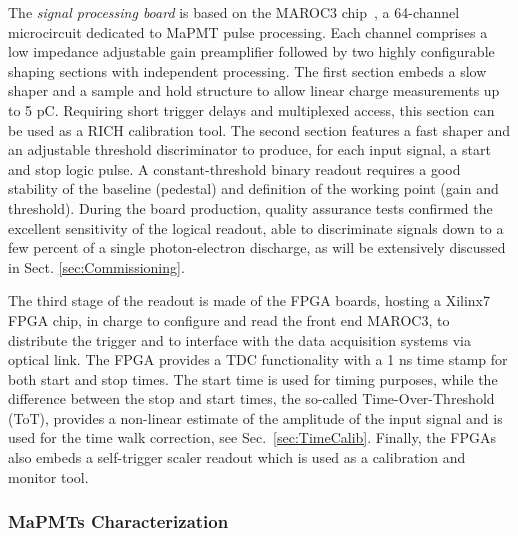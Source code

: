 \documentclass[5p,times,twocolumn]{elsarticle}
\begin{document}
The {\it signal processing board} is based on the MAROC3 chip~\cite{MAROC3:chip}, a 64-channel microcircuit dedicated to MaPMT pulse processing. Each channel comprises a low impedance adjustable gain preamplifier followed by two highly configurable shaping sections with independent processing. The first section embeds a slow shaper and a sample and hold structure to allow linear charge measurements up to 5 pC. Requiring short trigger delays and multiplexed access, this section can be used as a RICH calibration tool. The second section features a fast shaper and an adjustable threshold discriminator to produce, for each input signal, a start and stop logic pulse. A constant-threshold binary readout requires a good stability of the baseline (pedestal) and definition of the working point (gain and threshold). During the board production, quality assurance tests confirmed the excellent sensitivity of the logical readout, able to discriminate signals down to a few percent of a single photon-electron discharge, as will be extensively discussed in Sect. \ref{sec:Commissioning}.

The third stage of the readout is made of the FPGA boards, hosting a Xilinx7 FPGA chip, in charge to configure and read the front end MAROC3, to distribute the trigger and to interface with the data acquisition systems via optical link. The FPGA provides a TDC functionality with a 1 ns time stamp for both start and stop times. The start time is used for timing purposes, while the difference between the stop and start times, the so-called Time-Over-Threshold (ToT), provides a non-linear estimate of the amplitude of the input signal and is used for the time walk correction, see Sec.~\ref{sec:TimeCalib}. Finally, the FPGAs also embeds a self-trigger scaler readout which is used as a calibration and monitor tool.

\subsubsection{MaPMTs Characterization}
\label{sec:FEtests}
\end{document}
